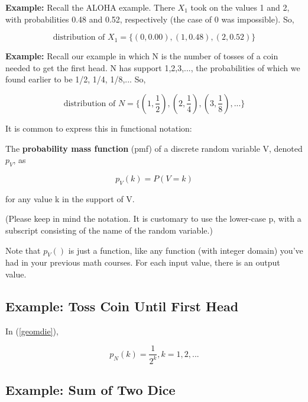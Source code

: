 {\bf Example:}  Recall the ALOHA example. There $X_1$ took on the values
1 and 2, with probabilities 0.48 and 0.52, respectively (the case of 0
was impossible).  So, 

\begin{equation}
\textrm{distribution of } X_1 =
\{
(0,0.00),
(1,0.48),
(2,0.52)
\}
\end{equation}

{\bf Example:}  Recall our example in which N is the number of tosses of a
coin needed to get the first head.  N has support 1,2,3,..., the 
probabilities of which we found earlier to be 1/2, 1/4, 1/8,...  So, 

\begin{equation}
\textrm{distribution of } N =
\label{geomdie}
\{
(1,\frac{1}{2}),
(2,\frac{1}{4}),
(3,\frac{1}{8}),
...
\}
\end{equation}

It is common to express this in functional notation:  

\begin{definition}
The {\bf probability mass function} (pmf) of a 
discrete random variable V, denoted $p_V$, as

\begin{equation}
p_V(k) = P(V = k)
\end{equation}

for any value k in the support of V.
\end{definition}

(Please keep in mind the notation.  It is customary to use the
lower-case p, with a subscript consisting of the name of the random
variable.)

Note that $p_V()$ is just a function, like any function (with integer
domain) you've had in your previous math courses.  For each input value,
there is an output value.

\subsection{Example:  Toss Coin Until First Head}

In (\ref{geomdie}),

\begin{equation}
\label{geompre}
p_N(k) = \frac{1}{2^k}, k = 1,2,...
\end{equation}

\subsection{Example:  Sum of Two Dice}

